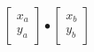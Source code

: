 \documentclass[preview]{standalone}
\begin{document}
\begin{align*}
\begin{bmatrix} x_a \\ y_a \end{bmatrix} \bullet \begin{bmatrix} x_b \\ y_b \end{bmatrix}
\end{align*}
\end{document}
